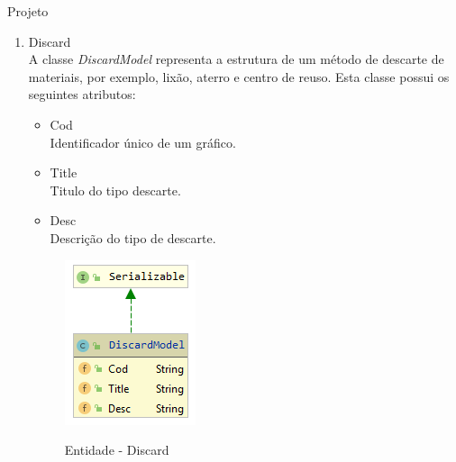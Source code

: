 \documentclass[
	12pt,				%
	openright,			%
	twoside,			%
	a4paper,			%
	english,			%
	french,				%
	spanish,			%
	brazil				%
	]{abntex2}
\begin{document}
\begin{chapter}{Projeto}
\begin{enumerate}
  \item{Discard}   \\ A classe \textit{DiscardModel} representa a estrutura de um método de descarte de materiais, por exemplo, lixão, aterro e centro de reuso. Esta classe possui os seguintes atributos:
  
  \begin{itemize}
  \item{Cod}\\ Identificador único de um gráfico.
       \item{Title}\\Titulo do tipo descarte.
         \item{Desc}\\ Descrição do tipo de descarte.
  
    
\end{itemize}
  
\begin{figure}[h]
\centering
   \caption{Entidade - Discard}
   \includegraphics[scale=1.0]{media/discardModel.png}
     \label{fig:discardModel}
\end{figure}


\end{enumerate}
\end{chapter}
\end{document}
